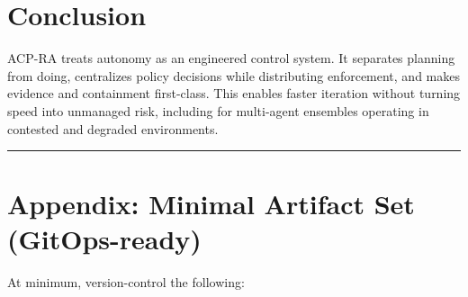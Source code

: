 \documentclass[11pt]{article}
\begin{document}
\hypertarget{conclusion}{%
\section{Conclusion}\label{conclusion}}

ACP-RA treats autonomy as an engineered control system. It separates
planning from doing, centralizes policy decisions while distributing
enforcement, and makes evidence and containment first-class. This
enables faster iteration without turning speed into unmanaged risk,
including for multi-agent ensembles operating in contested and degraded
environments.

\vspace{2pt}\begin{center}\rule{0.62\linewidth}{0.6pt}\end{center}\vspace{2pt}

\hypertarget{appendix-minimal-artifact-set-gitops-ready}{%
\section{Appendix: Minimal Artifact Set (GitOps-ready)}\label{appendix-minimal-artifact-set-gitops-ready}}

At minimum, version-control the following:
\end{document}
